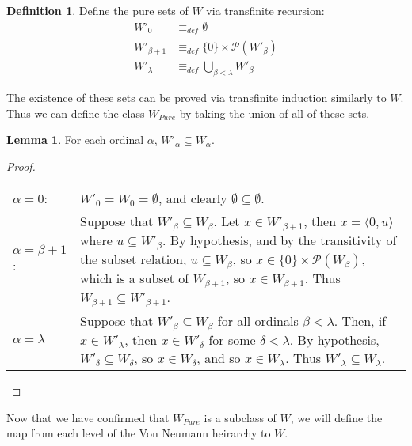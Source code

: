 \documentclass[11pt]{report}
\newcommand{\eqdef}{\equiv_\mathit{def}}
\newcommand{\pair}[2]{\langle #1,#2 \rangle}
\theoremstyle{definition}
\theoremstyle{theorem}
\theoremstyle{lemma}
\newtheorem{definition}{Definition}[section]
\newtheorem{lemma}[theorem]{Lemma}
\begin{document}
\begin{definition}
Define the pure sets of $W$ via transfinite recursion:
\begin{align*}
W'_0 &\eqdef \emptyset\\
W'_{\beta+1} &\eqdef \{0\}\times\mathcal{P}(W'_\beta) \\
W'_\lambda &\eqdef \bigcup_{\beta < \lambda} W'_\beta
\end{align*}
\end{definition}
\noindent
The existence of these sets can be proved via transfinite induction similarly to $W$. Thus we can define the class $W_{\mathit{Pure}}$ by taking the union of all of these sets.
\begin{lemma} For each ordinal $\alpha$, $W'_\alpha \subseteq W_\alpha$.
  \begin{proof} \hspace{1mm}\\
    \begin{tabular}{p{20mm} p{137mm}}
      $\alpha = 0$: \rule{0pt}{4ex} &
      $W'_0 = W_0 = \emptyset$, and clearly $\emptyset \subseteq \emptyset$. \\
      $\alpha = \beta+1$: \rule{0pt}{4ex} &
      Suppose that $W'_\beta \subseteq W_\beta$. Let $x\in W'_{\beta+1}$, then $x = \pair{0}{u}$ where $u \subseteq W'_\beta$. By hypothesis, and by the transitivity of the subset relation, $u\subseteq W_\beta$, so $x\in\{0\}\times\mathcal{P}(W_\beta)$, which is a subset of $W_{\beta+1}$, so $x\in W_{\beta+1}$. Thus $W_{\beta+1} \subseteq W'_{\beta+1}$.
      \\
      $\alpha = \lambda$ \rule{0pt}{4ex} &
      Suppose that $W'_{\beta} \subseteq W_{\beta}$ for all ordinals $\beta < \lambda$. Then, if $x\in W'_\lambda$, then $x\in W'_\delta$ for some $\delta < \lambda$. By hypothesis, $W'_\delta \subseteq W_\delta$, so $x\in W_\delta$, and so $x\in W_\lambda$. Thus $W'_\lambda\subseteq W_\lambda$.
    \end{tabular}
  \end{proof}
\end{lemma}
\noindent
Now that we have confirmed that $W_{\mathit{Pure}}$ is a subclass of $W$, we will define the map from each level of the Von Neumann heirarchy to $W$.
\end{document}
